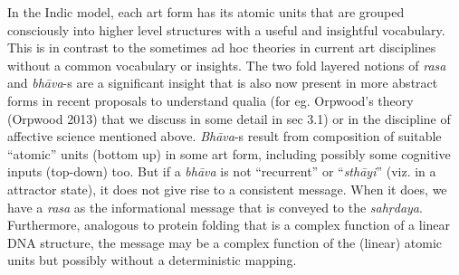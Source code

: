 In the Indic model, each art form has its atomic units that are grouped consciously into higher level structures with a useful and insightful vocabulary. This is in contrast to the sometimes ad hoc theories in current art disciplines without a common vocabulary or insights. The two fold layered notions of \textsl{rasa} and \textsl{bhāva}-s are a significant insight that is also now present in more abstract forms in recent proposals to understand qualia (for eg. Orpwood’s theory (Orpwood 2013) that we discuss in some detail in sec 3.1) or in the discipline of affective science mentioned above. \textsl{Bhāva}-s result from composition of suitable “atomic” units (bottom up) in some art form, including possibly some cognitive inputs (top-down) too. But if a \textsl{bhāva} is not “recurrent” or “\textsl{sthāyi}” (viz. in a attractor state), it does not give rise to a consistent message. When it does, we have a \textsl{rasa} as the informational message that is conveyed to the \textsl{sahṛdaya}. Furthermore, analogous to protein folding that is a complex function of a linear DNA structure, the message may be a complex function of the (linear) atomic units but possibly without a deterministic mapping.

